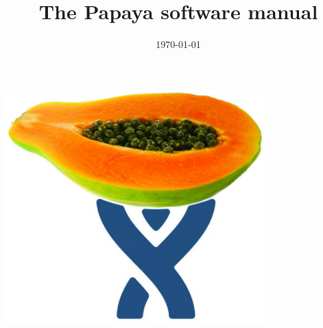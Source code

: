 \title{The Papaya software manual}
\date{\today}
\maketitle
\vspace{2cm}
\begin{center}
    \includegraphics[width=10cm]{document/logo.png}
\end{center}
\cleardoublepage
